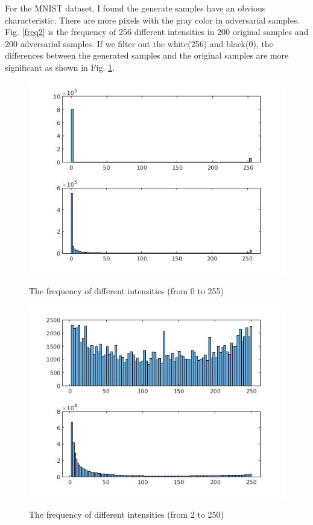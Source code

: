 \documentclass[a4paper]{article}
\begin{document}
For the MNIST dataset, I found the generate samples have an obvious characteristic. There are more pixels with the gray color in adversarial samples. Fig. \ref{freq2} is the frequency of 256 different intensities in 200 original samples and 200 adversarial samples. If we filter out the white(256) and black(0), the differences between the generated samples and the original samples are more significant as shown in Fig. \ref{freq}.
\begin{figure}
\centering
\begin{minipage}[t]{0.45\textwidth}
\centering
\includegraphics[scale=0.3]{freq2.jpg}
\label{freq2}
\caption{The frequency of different intensities (from 0 to 255)}
\end{minipage}
\begin{minipage}[t]{0.45\textwidth}
\centering
\includegraphics[scale=0.3]{freq.jpg}
\label{freq}
\caption{The frequency of different intensities (from 2 to 250)}
\end{minipage}
\end{figure}
\end{document}
